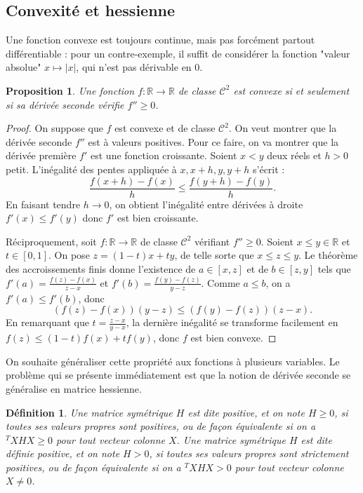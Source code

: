 \documentclass[a4paper]{book}
\newtheorem{definition}{D\'efinition}
\newtheorem{proposition}{Proposition}
\newtheorem{proof}{Preuve}
\newcommand{\Rr}{\mathbb{R}}
\begin{document}
\subsection{Convexité et hessienne}

Une fonction convexe est toujours continue, mais pas forcément partout différentiable : pour un contre-exemple, il suffit de considérer la fonction "valeur absolue" $x \mapsto |x|$, qui n'est pas dérivable en $0$.

\bigskip

\begin{proposition}
Une fonction $f : \Rr \to \Rr$ de classe $\mathcal{C}^2$ est convexe si et seulement si sa dérivée seconde vérifie $f'' \geq 0$.
\end{proposition}

\begin{proof}
On suppose que $f$ est convexe et de classe $\mathcal{C}^2$. On veut montrer que la dérivée seconde $f''$ est à valeurs positives. Pour ce faire, on va montrer que la dérivée première $f'$ est une fonction croissante. Soient $x<y$ deux réels et $h>0$ petit. L'inégalité des pentes appliquée à $x,x+h,y,y+h$ s'écrit : $$\frac{f(x+h)-f(x)}{h} \le \frac{f(y+h)-f(y)}{h}.$$ En faisant tendre $h \to 0$, on obtient l'inégalité entre dérivées à droite $f'(x) \le f'(y)$ donc $f'$ est bien croissante.

\bigskip

Réciproquement, soit $f : \Rr \to \Rr$ de classe $\mathcal{C}^2$ vérifiant $f'' \ge 0$. Soient $x \le y \in \Rr$ et $t \in [0,1]$. On pose $z = (1-t) x + t y$, de telle sorte que $x \le z \le y$. Le théorème des accroissements finis donne l'existence de $a \in [x,z]$ et de $b \in [z,y]$ tels que $f'(a) = \frac{f(z)-f(x)}{z-x}$ et $f'(b) = \frac{f(y)-f(z)}{y-z}$. Comme $a \le b$, on a $f'(a) \le f'(b)$, donc $$(f(z)-f(x))(y-z) \le (f(y)-f(z))(z-x).$$ En remarquant que $t = \frac{z-x}{y-x}$, la dernière inégalité se transforme facilement en $f(z) \le (1-t) f(x) + t f(y)$, donc $f$ est bien convexe.
\end{proof}

On souhaite généraliser cette propriété aux fonctions à plusieurs variables. Le problème qui se présente immédiatement est que la notion de dérivée seconde se généralise en matrice hessienne.

\begin{definition}
Une matrice symétrique $H$ est dite positive, et on note $H \ge 0$, si toutes ses valeurs propres sont positives, ou de façon équivalente si on a ${}^TX H X \ge 0$ pour tout vecteur colonne $X$.
Une matrice symétrique $H$ est dite définie positive, et on note $H > 0$, si toutes ses valeurs propres sont strictement positives, ou de façon équivalente si on a ${}^TX H X > 0$ pour tout vecteur colonne $X \neq 0$. 
\end{definition}
\end{document}
